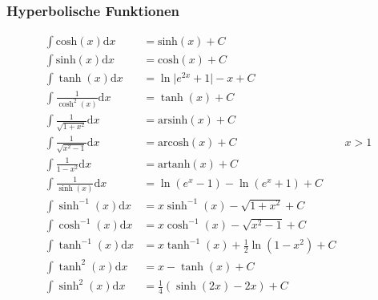 \documentclass[8pt, a4paper, landscape, fleqn]{scrartcl}
\begin{document}
\begin{multicols*}{3}
				\subsubsection{Hyperbolische Funktionen}
					\vspace{-7pt}
					\begin{align*}
					    \int \text{cosh}(x)\text{d}x&=\text{sinh}(x)+C\\
					    \int \text{sinh}(x)\text{d}x&=\text{cosh}(x)+C\\
					    \int \tanh(x) \text{d}x&= \ln \vert e^{2x}+1\vert -x +C\\
					    \int \frac{1}{\cosh^2(x)}\text{d}x&=\tanh(x)+C\\
						\int \frac{1}{\sqrt{1+x^2}}\text{d}x&=\text{arsinh}(x)+C\\
						\int \frac{1}{\sqrt{x^2-1}}\text{d}x&=\text{arcosh}(x)+C &x>1\\
						\int \frac{1}{1-x^2}\text{d}x&=\text{artanh}(x)+C\\
						\int\frac{1}{\sinh{(x)}}\text{d}x&=\ln{\left(e^x-1\right)}-\ln{\left(e^x+1\right)}+C\\
						\int \sinh^{-1}{(x)}\text{d}x&=x\sinh^{-1}{(x)}-\sqrt{1+x^2}+C\\
					    \int\cosh^{-1}{(x)}\text{d}x&=x\cosh^{-1}{(x)}-\sqrt{x^2-1}+C\\
					    \int\tanh^{-1}{(x)}\text{d}x&=x\tanh^{-1}{(x)}+\frac{1}{2}\ln{(1-x^2)}+C\\
					    \int \tanh^2(x)\text{d}x&= x- \tanh(x) +C \\
    					\int \sinh^2(x)\text{d}x&= \frac{1}{4}(\sinh(2x)-2x)+C
					\end{align*}

\end{multicols*}
\end{document}
